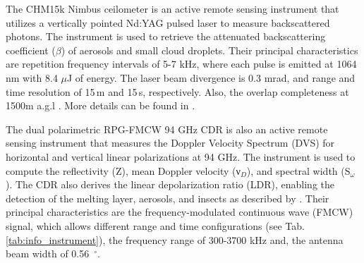 The CHM15k Nimbus ceilometer is an active remote sensing instrument that utilizes a vertically pointed Nd:YAG pulsed laser to measure backscattered photons. The instrument is used to retrieve the attenuated backscattering coefficient ($\beta$) of aerosols and small cloud droplets. Their principal characteristics are repetition frequency intervals of 5-7 kHz, where each pulse is emitted at 1064 nm with 8.4 $\mu$J of energy. The laser beam divergence is 0.3 mrad, and range and time resolution of 15\,m and 15\,s, respectively. Also, the overlap completeness at 1500m a.g.l \citep{heeseCeilometerLidarComparison2010}. More details can be found in \citep{cazorlaRealtimeProcessingCeilometer2017}.

The dual polarimetric RPG-FMCW 94 GHz CDR is also an active remote sensing instrument that measures the Doppler Velocity Spectrum (DVS) for horizontal and vertical linear polarizations at 94 GHz. The instrument is used to compute the reflectivity (Z), mean Doppler velocity (ν$_{D}$), and spectral width (S$_{\omega}$). The CDR also derives the linear depolarization ratio (LDR), enabling the detection of the melting layer, aerosols, and insects as described by \cite{hoganFacilitatingCloudRadar2004}. Their principal characteristics are the frequency-modulated continuous wave (FMCW) signal, which allows different range and time configurations (see Tab. \ref{tab:info_instrument}), the frequency range of 300-3700 kHz and, the antenna beam width of 0.56~$^{\circ}$. 

